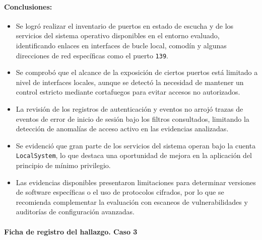 \paragraph{Conclusiones:}
\begin{itemize}
    \item Se logró realizar el inventario de puertos en estado de escucha y de los servicios del sistema operativo disponibles en el entorno evaluado, identificando enlaces en interfaces de bucle local, comodín y algunas direcciones de red específicas como el puerto \texttt{139}.
    \item Se comprobó que el alcance de la exposición de ciertos puertos está limitado a nivel de interfaces locales, aunque se detectó la necesidad de mantener un control estricto mediante cortafuegos para evitar accesos no autorizados.
    \item La revisión de los registros de autenticación y eventos no arrojó trazas de eventos de error de inicio de sesión bajo los filtros consultados, limitando la detección de anomalías de acceso activo en las evidencias analizadas.
    \item Se evidenció que gran parte de los servicios del sistema operan bajo la cuenta \texttt{LocalSystem}, lo que destaca una oportunidad de mejora en la aplicación del principio de mínimo privilegio.
    \item Las evidencias disponibles presentaron limitaciones para determinar versiones de software específicas o el uso de protocolos cifrados, por lo que se recomienda complementar la evaluación con escaneos de vulnerabilidades y auditorías de configuración avanzadas.
\end{itemize}


\paragraph{Ficha de registro del hallazgo. Caso 3}

